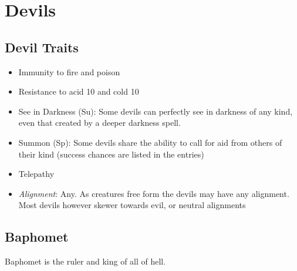 \section{Devils}
\label{sec:monster:Devils}

\subsection{Devil Traits}
\begin{itemize}[noitemsep]
  \item Immunity to fire and poison
  \item Resistance to acid 10 and cold 10
  \item See in Darkness (Su): Some devils can perfectly see in darkness of any
    kind, even that created by a deeper darkness spell.
  \item Summon (Sp): Some devils share the ability to call for aid from others
    of their kind (success chances are listed in the entries)
  \item Telepathy
  \item \emph{Alignment}: Any. As creatures free form the 
    devils may have any alignment. Most devils however skewer towards evil, or
    neutral alignments
\end{itemize}

\subsection{Baphomet}
\label{sec:monster:Baphomet}

Baphomet is the ruler and king of all of hell.

